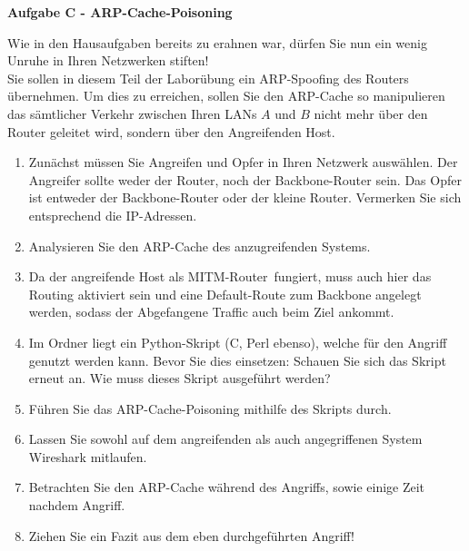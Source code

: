 \documentclass[paper=a4,fontsize=11pt]{scrartcl}%
\begin{document}
\begin{center}
\Large{\textbf{Aufgabe C - ARP-Cache-Poisoning}}
\end{center}\vskip0.25in
Wie in den Hausaufgaben bereits zu erahnen war, dürfen Sie nun ein wenig Unruhe in Ihren Netzwerken stiften!\\
Sie sollen in diesem Teil der Laborübung ein ARP-Spoofing des Routers übernehmen. Um dies zu erreichen, sollen Sie den ARP-Cache so manipulieren das sämtlicher Verkehr zwischen Ihren LANs $A$ und $B$ nicht mehr über den Router geleitet wird, sondern über den Angreifenden Host.
\begin{enumerate}
	\item Zunächst müssen Sie Angreifen und Opfer in Ihren Netzwerk auswählen. Der Angreifer sollte weder der Router, noch der Backbone-Router sein. Das Opfer ist entweder der Backbone-Router oder der kleine Router. Vermerken Sie sich entsprechend die IP-Adressen.
	\item Analysieren Sie den ARP-Cache des anzugreifenden Systems.
	\item Da der angreifende Host als \glqq MITM-Router\grqq\ fungiert, muss auch hier das Routing aktiviert sein und eine Default-Route zum Backbone angelegt werden, sodass der Abgefangene Traffic auch beim Ziel ankommt.
	\item Im Ordner  liegt ein Python-Skript (C, Perl ebenso), welche für den Angriff genutzt werden kann. Bevor Sie dies einsetzen: Schauen Sie sich das Skript erneut an. Wie muss dieses Skript ausgeführt werden?
	\item Führen Sie das ARP-Cache-Poisoning mithilfe des Skripts durch.
	\item Lassen Sie sowohl auf dem angreifenden als auch angegriffenen System Wireshark mitlaufen.
	\item Betrachten Sie den ARP-Cache während des Angriffs, sowie einige Zeit nachdem Angriff.
	\item Ziehen Sie ein Fazit aus dem eben durchgeführten Angriff!
\end{enumerate}
\end{document}

